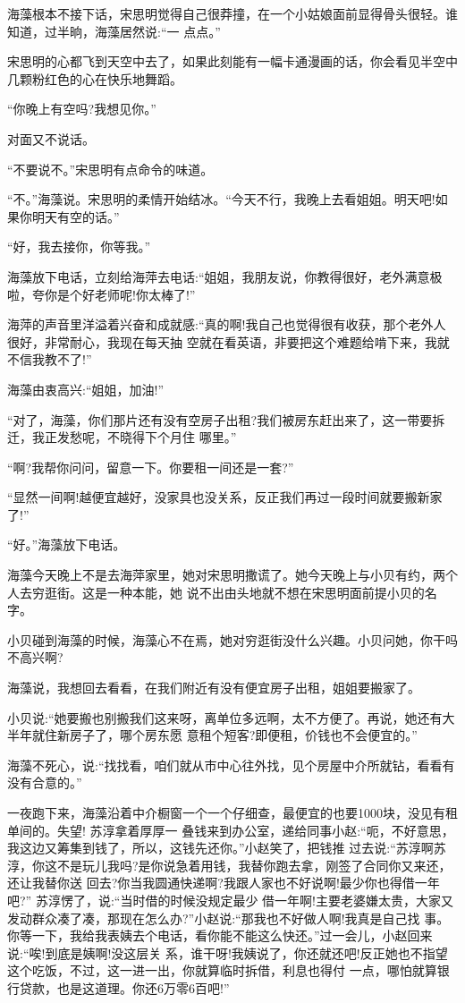 \documentclass[11pt,a4paper,onecolumn]{article}
\begin{document}
海藻根本不接下话，宋思明觉得自己很莽撞，在一个小姑娘面前显得骨头很轻。谁知道，过半晌，海藻居然说:``一
点点。''

宋思明的心都飞到天空中去了，如果此刻能有一幅卡通漫画的话，你会看见半空中几颗粉红色的心在快乐地舞蹈。

``你晚上有空吗?我想见你。''

对面又不说话。

``不要说不。''宋思明有点命令的味道。

``不。''海藻说。宋思明的柔情开始结冰。``今天不行，我晚上去看姐姐。明天吧!如果你明天有空的话。''

``好，我去接你，你等我。''

海藻放下电话，立刻给海萍去电话:``姐姐，我朋友说，你教得很好，老外满意极啦，夸你是个好老师呢!你太棒了!''

海萍的声音里洋溢着兴奋和成就感:``真的啊!我自己也觉得很有收获，那个老外人很好，非常耐心，我现在每天抽
空就在看英语，非要把这个难题给啃下来，我就不信我教不了!''

海藻由衷高兴:``姐姐，加油!''

``对了，海藻，你们那片还有没有空房子出租?我们被房东赶出来了，这一带要拆迁，我正发愁呢，不晓得下个月住
哪里。''

``啊?我帮你问问，留意一下。你要租一间还是一套?''

``显然一间啊!越便宜越好，没家具也没关系，反正我们再过一段时间就要搬新家了!''

``好。''海藻放下电话。

海藻今天晚上不是去海萍家里，她对宋思明撒谎了。她今天晚上与小贝有约，两个人去穷逛街。这是一种本能，她
说不出由头地就不想在宋思明面前提小贝的名字。

小贝碰到海藻的时候，海藻心不在焉，她对穷逛街没什么兴趣。小贝问她，你干吗不高兴啊?

海藻说，我想回去看看，在我们附近有没有便宜房子出租，姐姐要搬家了。

小贝说:``她要搬也别搬我们这来呀，离单位多远啊，太不方便了。再说，她还有大半年就住新房子了，哪个房东愿
意租个短客?即便租，价钱也不会便宜的。''

海藻不死心，说:``找找看，咱们就从市中心往外找，见个房屋中介所就钻，看看有没有合意的。''

一夜跑下来，海藻沿着中介橱窗一个一个仔细查，最便宜的也要1000块，没见有租单间的。失望! 苏淳拿着厚厚一
叠钱来到办公室，递给同事小赵:``呃，不好意思，我这边又筹集到钱了，所以，这钱先还你。''小赵笑了，把钱推
过去说:``苏淳啊苏淳，你这不是玩儿我吗?是你说急着用钱，我替你跑去拿，刚签了合同你又来还，还让我替你送
回去?你当我圆通快递啊?我跟人家也不好说啊!最少你也得借一年吧?'' 苏淳愣了，说:``当时借的时候没规定最少
借一年啊!主要老婆嫌太贵，大家又发动群众凑了凑，那现在怎么办?''小赵说:``那我也不好做人啊!我真是自己找
事。你等一下，我给我表姨去个电话，看你能不能这么快还。''过一会儿，小赵回来说:``唉!到底是姨啊!没这层关
系，谁干呀!我姨说了，你还就还吧!反正她也不指望这个吃饭，不过，这一进一出，你就算临时拆借，利息也得付
一点，哪怕就算银行贷款，也是这道理。你还6万零6百吧!''
\end{document}
